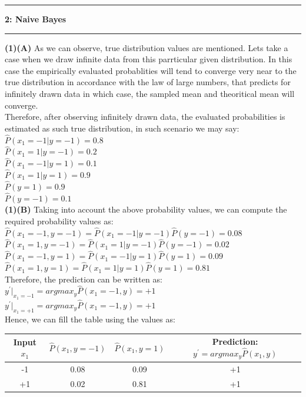 \documentclass[11pt]{article}
\newcommand\question[2]{\vspace{.25in}\hrule\textbf{#1: #2}\vspace{.5em}\hrule\vspace{.10in}}
\renewcommand\part[1]{\vspace{.10in}\textbf{(#1)}}
\begin{document}
\question{2}{Naive Bayes}
\part{1}\textbf{(A)} As we can observe, true distribution values are mentioned. Lets take a case when we draw infinite data from this parrticular given distribution. In this case the empirically evaluated probablities will tend to converge very near to the true distribution in accordance with the law of large numbers, that predicts for infinitely drawn data in which case, the sampled mean and theoritical mean will converge.\\

Therefore, after observing infinitely drawn data, the evaluated probabilities is estimated as such true distribution, in such scenario we may say:\\
$\hat{P}(x_1 = -1| y = -1) = 0.8$\\
$\hat{P}(x_1 = 1| y = -1) = 0.2$\\
$\hat{P}(x_1 = -1| y = 1) = 0.1$\\
$\hat{P}(x_1 = 1| y = 1) = 0.9$\\
$\hat{P}(y=1) = 0.9$\\
$\hat{P}(y=-1) = 0.1$\\


\part{1}\textbf{(B)} Taking into account the above probability values, we can compute the required probability values as:\\
$\hat{P}(x_1 = -1, y = -1) = \hat{P}(x_1 = -1| y = -1)\hat{P}(y= -1) = 0.08$\\
$\hat{P}(x_1 = 1, y = -1) = \hat{P}(x_1 = 1| y = -1)\hat{P}(y= -1) = 0.02$\\
$\hat{P}(x_1 = -1, y = 1) = \hat{P}(x_1 = -1| y = 1)\hat{P}(y= 1) = 0.09$\\
$\hat{P}(x_1 = 1, y = 1) = \hat{P}(x_1 = 1| y = 1)\hat{P}(y= 1) = 0.81$\\
Therefore, the prediction can be written as:\\
$y^\prime\bigg |_{x_1=-1} = argmax_y\hat{P}(x_1=-1,y) = +1$\\
$y^\prime\bigg |_{x_1=+1} = argmax_y\hat{P}(x_1=-1,y) = +1$\\
Hence, we can fill the table using the values as:\\
\begin{longtable}{c|c|c|c}
	  Input $x_1$ & $\hat{P}(x_1,y=-1)$ & $\hat{P}(x_1,y=1)$  & Prediction: $y^\prime = arg max_y \hat{P}(x_1,y)$ \\ [0.5ex]
  \hline
	  -1 & 0.08 & 0.09 & +1  \\
	  +1 & 0.02 & 0.81 & +1 \\
  \end{longtable}
\end{document}
